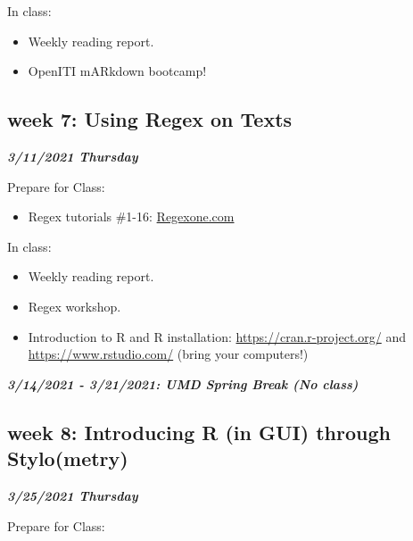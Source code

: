 \documentclass[
]{book}
\providecommand{\tightlist}{%
  \setlength{\itemsep}{0pt}\setlength{\parskip}{0pt}}
\begin{document}
In class:

\begin{itemize}
\tightlist
\item
  Weekly reading report.
\item
  OpenITI mARkdown bootcamp!
\end{itemize}

\hypertarget{week-7-using-regex-on-texts}{%
\subsection{week 7: Using Regex on Texts}\label{week-7-using-regex-on-texts}}

\textbf{\emph{3/11/2021 Thursday}}

Prepare for Class:

\begin{itemize}
\tightlist
\item
  Regex tutorials \#1-16: \url{Regexone.com}
\end{itemize}

In class:

\begin{itemize}
\tightlist
\item
  Weekly reading report.
\item
  Regex workshop.
\item
  Introduction to R and R installation: \url{https://cran.r-project.org/} and \url{https://www.rstudio.com/} (bring your computers!)
\end{itemize}

\textbf{\emph{3/14/2021 - 3/21/2021: UMD Spring Break (No class)}}

\hypertarget{week-8-introducing-r-in-gui-through-stylometry}{%
\subsection{week 8: Introducing R (in GUI) through Stylo(metry)}\label{week-8-introducing-r-in-gui-through-stylometry}}

\textbf{\emph{3/25/2021 Thursday}}

Prepare for Class:
\end{document}
